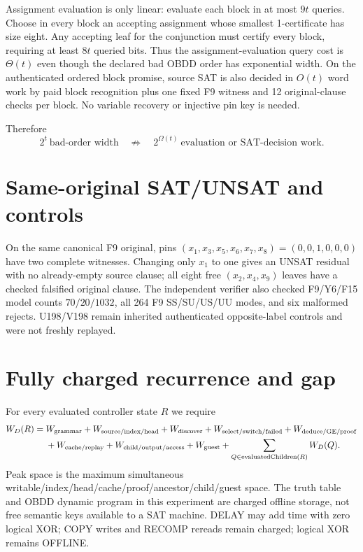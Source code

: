 \documentclass[11pt]{article}
\begin{document}
Assignment evaluation is only linear: evaluate each block in at most $9t$ queries.  Choose
in every block an accepting assignment whose smallest 1-certificate has size eight.  Any
accepting leaf for the conjunction must certify every block, requiring at least $8t$ queried
bits.  Thus the assignment-evaluation query cost is $\Theta(t)$ even though the declared bad
OBDD order has exponential width.  On the authenticated ordered block promise, source SAT is
also decided in $O(t)$ word work by paid block recognition plus one fixed F9 witness and 12
original-clause checks per block.  No variable recovery or injective pin key is needed.

Therefore
\[
 2^t\ \text{bad-order width}\quad\not\Rightarrow\quad
 2^{\Omega(t)}\ \text{evaluation or SAT-decision work}.
\]

\section{Same-original SAT/UNSAT and controls}

On the same canonical F9 original, pins
$(x_1,x_3,x_5,x_6,x_7,x_8)=(0,0,1,0,0,0)$ have two complete witnesses.
Changing only $x_1$ to one gives an UNSAT residual with no already-empty source clause;
all eight free $(x_2,x_4,x_9)$ leaves have a checked falsified original clause.
The independent verifier also checked F9/Y6/F15 model counts $70/20/1032$, all 264 F9
SS/SU/US/UU modes, and six malformed rejects.  U198/V198 remain inherited authenticated
opposite-label controls and were not freshly replayed.

\section{Fully charged recurrence and gap}

For every evaluated controller state $R$ we require
\begin{align*}
W_D(R)={}&W_{\rm grammar}+W_{\rm source/index/head}+W_{\rm discover}
+W_{\rm select/switch/failed}+W_{\rm deduce/GE/proof}\\
&+W_{\rm cache/replay}+W_{\rm child/output/access}+W_{\rm guest}
+\sum_{Q\in\mathrm{evaluatedChildren}(R)}W_D(Q).
\end{align*}
Peak space is the maximum simultaneous writable/index/head/cache/proof/ancestor/child/guest
space.  The truth table and OBDD dynamic program in this experiment are charged offline
storage, not free semantic keys available to a SAT machine.  DELAY may add time with zero
logical XOR; COPY writes and RECOMP rereads remain charged; logical XOR remains OFFLINE.
\end{document}
